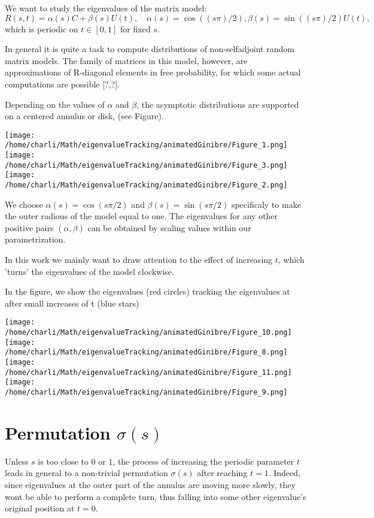 \documentclass{article}
\begin{document}
	We want to study the eigenvalues of the matrix model:
	$$R(s,t) = \alpha(s)C + \beta(s)U(t),\quad  \alpha(s)= \cos((s\pi)/2), \beta(s)= \sin((s\pi) /2)U(t),$$ 
	which is periodic on $t\in [0,1]$ for fixed $s$.

	In general it is quite a task to compute distributions 
	of non-selfadjoint random matrix models. 
	The family of matrices in this model, however, are approximations of R-diagonal elements in free probability, 
	for which some actual computations are possible [?,?]. 

	Depending on the values of $\alpha$ and $\beta$, 
	the asymptotic distributions are supported on a centered annulus or disk,  
	(see Figure). 

	\texttt{[image: /home/charli/Math/eigenvalueTracking/animatedGinibre/Figure\_1.png]}
	\texttt{[image: /home/charli/Math/eigenvalueTracking/animatedGinibre/Figure\_3.png]}
	\texttt{[image: /home/charli/Math/eigenvalueTracking/animatedGinibre/Figure\_2.png]}

	We choose $\alpha(s) = \cos(s \pi /2)$ and $\beta(s) = \sin(s \pi /2)$ 
	specificaly to make the outer radious of the model equal to one. 
	The eigenvalues for any other positive pairs $(\alpha, \beta)$ can be obtained 
	by scaling values within our parametrization.
	
	In this work we mainly want to draw attention to the effect of increasing $t$,
	which 'turns' the eigenvalues of the model clockwise.

	In the figure, we show the eigenvalues (red circles) tracking the eigenvalues 
	at after small increases of t (blue stars)
	
	\texttt{[image: /home/charli/Math/eigenvalueTracking/animatedGinibre/Figure\_10.png]} 
	\texttt{[image: /home/charli/Math/eigenvalueTracking/animatedGinibre/Figure\_8.png]} 
	\texttt{[image: /home/charli/Math/eigenvalueTracking/animatedGinibre/Figure\_11.png]} 
	\texttt{[image: /home/charli/Math/eigenvalueTracking/animatedGinibre/Figure\_9.png]}
	
	\newpage
	\section{Permutation $\sigma(s)$}

	Unless $s$ is too close to $0$ or $1$, the process of increasing the periodic parameter $t$
	leads in general to a non-trivial permutation $\sigma(s)$ after reaching $t=1$.
	Indeed, since eigenvalues at the outer part of the annulus are moving more slowly, 
	they wont be able to perform a complete turn, 
	thus falling into some other eigenvalue's original position at $t=0$.
\end{document}
